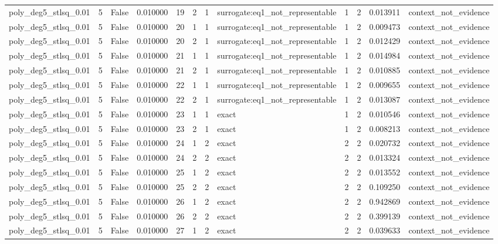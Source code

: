 \begin{tabular}{lrrrrrrlrrrl}
poly\_deg5\_stlsq\_0.01 & 5 & False & 0.010000 & 19 & 2 & 1 & surrogate:eq1\_not\_representable & 1 & 2 & 0.013911 & context\_not\_evidence \\
poly\_deg5\_stlsq\_0.01 & 5 & False & 0.010000 & 20 & 1 & 1 & surrogate:eq1\_not\_representable & 1 & 2 & 0.009473 & context\_not\_evidence \\
poly\_deg5\_stlsq\_0.01 & 5 & False & 0.010000 & 20 & 2 & 1 & surrogate:eq1\_not\_representable & 1 & 2 & 0.012429 & context\_not\_evidence \\
poly\_deg5\_stlsq\_0.01 & 5 & False & 0.010000 & 21 & 1 & 1 & surrogate:eq1\_not\_representable & 1 & 2 & 0.014984 & context\_not\_evidence \\
poly\_deg5\_stlsq\_0.01 & 5 & False & 0.010000 & 21 & 2 & 1 & surrogate:eq1\_not\_representable & 1 & 2 & 0.010885 & context\_not\_evidence \\
poly\_deg5\_stlsq\_0.01 & 5 & False & 0.010000 & 22 & 1 & 1 & surrogate:eq1\_not\_representable & 1 & 2 & 0.009655 & context\_not\_evidence \\
poly\_deg5\_stlsq\_0.01 & 5 & False & 0.010000 & 22 & 2 & 1 & surrogate:eq1\_not\_representable & 1 & 2 & 0.013087 & context\_not\_evidence \\
poly\_deg5\_stlsq\_0.01 & 5 & False & 0.010000 & 23 & 1 & 1 & exact & 1 & 2 & 0.010546 & context\_not\_evidence \\
poly\_deg5\_stlsq\_0.01 & 5 & False & 0.010000 & 23 & 2 & 1 & exact & 1 & 2 & 0.008213 & context\_not\_evidence \\
poly\_deg5\_stlsq\_0.01 & 5 & False & 0.010000 & 24 & 1 & 2 & exact & 2 & 2 & 0.020732 & context\_not\_evidence \\
poly\_deg5\_stlsq\_0.01 & 5 & False & 0.010000 & 24 & 2 & 2 & exact & 2 & 2 & 0.013324 & context\_not\_evidence \\
poly\_deg5\_stlsq\_0.01 & 5 & False & 0.010000 & 25 & 1 & 2 & exact & 2 & 2 & 0.013552 & context\_not\_evidence \\
poly\_deg5\_stlsq\_0.01 & 5 & False & 0.010000 & 25 & 2 & 2 & exact & 2 & 2 & 0.109250 & context\_not\_evidence \\
poly\_deg5\_stlsq\_0.01 & 5 & False & 0.010000 & 26 & 1 & 2 & exact & 2 & 2 & 0.942869 & context\_not\_evidence \\
poly\_deg5\_stlsq\_0.01 & 5 & False & 0.010000 & 26 & 2 & 2 & exact & 2 & 2 & 0.399139 & context\_not\_evidence \\
poly\_deg5\_stlsq\_0.01 & 5 & False & 0.010000 & 27 & 1 & 2 & exact & 2 & 2 & 0.039633 & context\_not\_evidence \\

\end{tabular}
